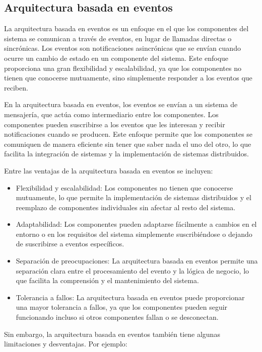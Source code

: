 \documentclass[executivepaper]{article}
\begin{document}
\subsection{Arquitectura basada en eventos}

La arquitectura basada en eventos es un enfoque en el que los componentes del sistema se comunican a través de eventos, en lugar de llamadas directas o sincrónicas. Los eventos son notificaciones asincrónicas que se envían cuando ocurre un cambio de estado en un componente del sistema. Este enfoque proporciona una gran flexibilidad y escalabilidad, ya que los componentes no tienen que conocerse mutuamente, sino simplemente responder a los eventos que reciben.

En la arquitectura basada en eventos, los eventos se envían a un sistema de mensajería, que actúa como intermediario entre los componentes. Los componentes pueden suscribirse a los eventos que les interesan y recibir notificaciones cuando se producen. Este enfoque permite que los componentes se comuniquen de manera eficiente sin tener que saber nada el uno del otro, lo que facilita la integración de sistemas y la implementación de sistemas distribuidos.

Entre las ventajas de la arquitectura basada en eventos se incluyen:

\begin{itemize}
\item Flexibilidad y escalabilidad: Los componentes no tienen que conocerse mutuamente, lo que permite la implementación de sistemas distribuidos y el reemplazo de componentes individuales sin afectar al resto del sistema.
\item Adaptabilidad: Los componentes pueden adaptarse fácilmente a cambios en el entorno o en los requisitos del sistema simplemente suscribiéndose o dejando de suscribirse a eventos específicos.
\item Separación de preocupaciones: La arquitectura basada en eventos permite una separación clara entre el procesamiento del evento y la lógica de negocio, lo que facilita la comprensión y el mantenimiento del sistema.
\item Tolerancia a fallos: La arquitectura basada en eventos puede proporcionar una mayor tolerancia a fallos, ya que los componentes pueden seguir funcionando incluso si otros componentes fallan o se desconectan.
\end{itemize}

Sin embargo, la arquitectura basada en eventos también tiene algunas limitaciones y desventajas. Por ejemplo:
\end{document}
